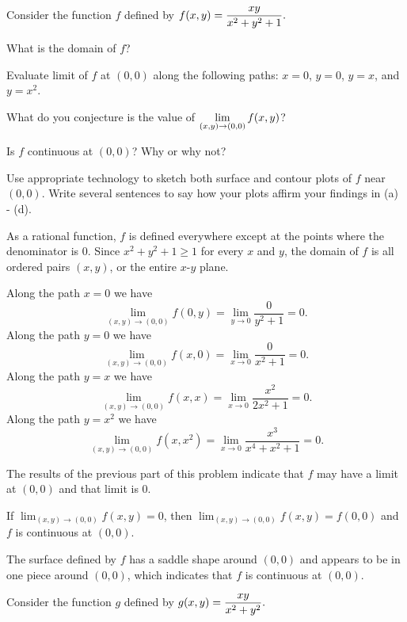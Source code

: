 \begin{exercises} 

\item \label{Ez:10.1.1}    Consider the function $f$ defined by $\displaystyle f(x,y) = \frac{xy}{x^2 + y^2 + 1}.$
				
    \ba
   	\item What is the domain of $f$?
	\item Evaluate limit of $f$ at $(0,0)$ along the following paths:  $x = 0$, $y = 0$, $y = x$, and $y = x^2$.
	\item What do you conjecture is the value of $\displaystyle \lim_{(x,y) \to (0,0)} f(x,y)$?
	\item Is $f$ continuous at $(0,0)$?  Why or why not?
	\item Use appropriate technology to sketch both surface and contour plots of $f$ near $(0,0)$.  Write several sentences to say how your plots affirm your findings in (a) - (d).
    \ea

\begin{exerciseSolution}
    \ba
   	\item As a rational function, $f$ is defined everywhere except at the points where the denominator is 0. Since $x^2 + y^2 + 1 \geq 1$ for every $x$ and $y$, the domain of $f$ is all ordered pairs $(x,y)$, or the entire $x$-$y$ plane. 
	\item Along the path $x=0$ we have 
\[\lim_{(x,y) \to (0,0)} f(0,y) = \lim_{y \to 0} \frac{0}{y^2+1} = 0.\]
Along the path $y=0$ we have 
\[\lim_{(x,y) \to (0,0)} f(x,0) = \lim_{x \to 0} \frac{0}{x^2+1} = 0.\]
Along the path $y=x$ we have 
\[\lim_{(x,y) \to (0,0)} f(x,x) = \lim_{x \to 0} \frac{x^2}{2x^2+1} = 0.\]
Along the path $y=x^2$ we have 
\[\lim_{(x,y) \to (0,0)} f(x,x^2) = \lim_{x \to 0} \frac{x^3}{x^4+x^2+1} = 0.\]
	\item The results of the previous part of this problem indicate that $f$ may have a limit at $(0,0)$ and that limit is 0.
	\item If $\lim_{(x,y) \to (0,0)} f(x,y) = 0$, then $\lim_{(x,y) \to (0,0)} f(x,y) = f(0,0)$ and $f$ is continuous at $(0,0)$. 
	\item The surface defined by $f$ has a saddle shape around $(0,0)$ and appears to be in one piece around $(0,0)$, which indicates that $f$ is continuous at $(0,0)$. 
    \ea
\end{exerciseSolution}

\item \label{Ez:10.1.2}    Consider the function $g$ defined by $\displaystyle g(x,y) = \frac{xy}{x^2 + y^2}.$
				

\end{exercises}
